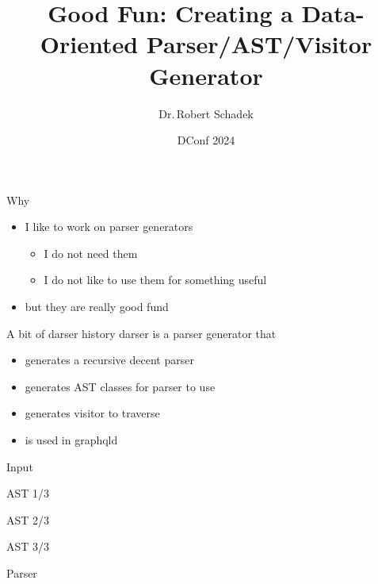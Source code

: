 \documentclass[aspectratio=169,notes]{beamer}
\title{Good Fun: Creating a Data-Oriented Parser/AST/Visitor Generator}
\date{DConf 2024}
\author{Dr.\,Robert Schadek}
\begin{document}
	\maketitle

	\begin{frame}[fragile]{Why}
		\begin{itemize}
			\item I like to work on parser generators
			\pause
			\begin{itemize}
				\item I do not need them
				\item I do not like to use them for something useful
			\end{itemize}
			\item but they are really good fund
		\end{itemize}
	\end{frame}

	\begin{frame}[fragile]{A bit of darser history}
		darser is a parser generator that
		\begin{itemize}
			\item generates a recursive decent parser
			\item generates AST classes for parser to use
			\item generates visitor to traverse
			\item is used in graphqld
		\end{itemize}
	\end{frame}

	\begin{frame}[fragile]{Input}
		
	\end{frame}

	\begin{frame}[fragile]{AST 1/3}
		
	\end{frame}

	\begin{frame}[fragile]{AST 2/3}
		
	\end{frame}

	\begin{frame}[fragile]{AST 3/3}
		
	\end{frame}

	\begin{frame}[fragile]{Parser}
		
	\end{frame}
\end{document}
